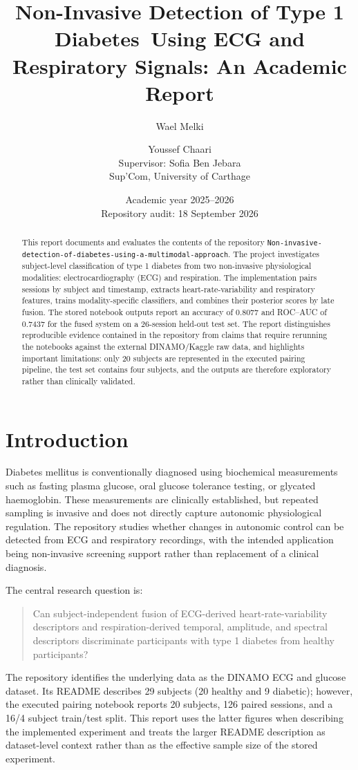 \documentclass[11pt,a4paper]{article}
\title{Non-Invasive Detection of Type 1 Diabetes\ Using ECG and Respiratory Signals: An Academic Report}
\author{Wael Melki \and Youssef Chaari\\[0.25em]\small Supervisor: Sofia Ben Jebara\\\small Sup'Com, University of Carthage}
\date{Academic year 2025--2026\\[0.4em]\small Repository audit: 18 September 2026}
\newcommand{\repo}{\texttt{Non-invasive-detection-of-diabetes-using-a-multimodal-approach}}
\begin{document}
\maketitle
\begin{abstract}
This report documents and evaluates the contents of the repository \repo. The project investigates subject-level classification of type 1 diabetes from two non-invasive physiological modalities: electrocardiography (ECG) and respiration. The implementation pairs sessions by subject and timestamp, extracts heart-rate-variability and respiratory features, trains modality-specific classifiers, and combines their posterior scores by late fusion. The stored notebook outputs report an accuracy of 0.8077 and ROC--AUC of 0.7437 for the fused system on a 26-session held-out test set. The report distinguishes reproducible evidence contained in the repository from claims that require rerunning the notebooks against the external DINAMO/Kaggle raw data, and highlights important limitations: only 20 subjects are represented in the executed pairing pipeline, the test set contains four subjects, and the outputs are therefore exploratory rather than clinically validated.
\end{abstract}

\tableofcontents
\newpage

\section{Introduction}
Diabetes mellitus is conventionally diagnosed using biochemical measurements such as fasting plasma glucose, oral glucose tolerance testing, or glycated haemoglobin. These measurements are clinically established, but repeated sampling is invasive and does not directly capture autonomic physiological regulation. The repository studies whether changes in autonomic control can be detected from ECG and respiratory recordings, with the intended application being non-invasive screening support rather than replacement of a clinical diagnosis.

The central research question is:
\begin{quote}
Can subject-independent fusion of ECG-derived heart-rate-variability descriptors and respiration-derived temporal, amplitude, and spectral descriptors discriminate participants with type 1 diabetes from healthy participants?
\end{quote}

The repository identifies the underlying data as the DINAMO ECG and glucose dataset. Its README describes 29 subjects (20 healthy and 9 diabetic); however, the executed pairing notebook reports 20 subjects, 126 paired sessions, and a 16/4 subject train/test split. This report uses the latter figures when describing the implemented experiment and treats the larger README description as dataset-level context rather than as the effective sample size of the stored experiment.
\end{document}
